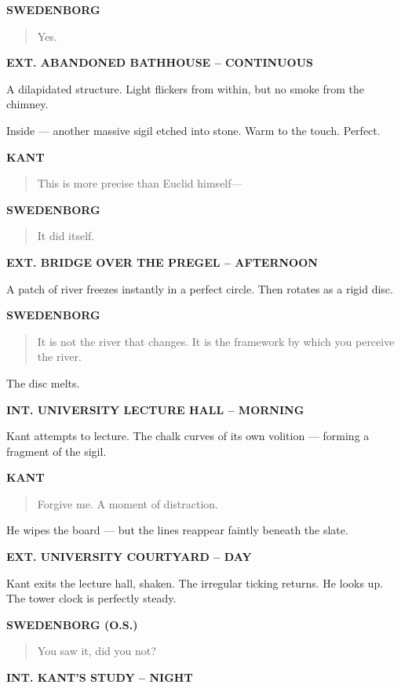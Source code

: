 \documentclass[12pt]{article}
\newcommand{\Scene}[1]{\vspace{1.2em}\textbf{#1}\vspace{0.8em}}
\newcommand{\Character}[1]{\vspace{0.8em}\textbf{#1}\vspace{0.4em}}
\newenvironment{Dialogue}{\begin{quote}\begin{RaggedRight}}{\end{RaggedRight}\end{quote}}
\newcommand{\Action}[1]{\vspace{0.4em}#1\vspace{0.4em}}
\begin{document}
\Character{SWEDENBORG}
\begin{Dialogue}
Yes.
\end{Dialogue}

\Scene{EXT. ABANDONED BATHHOUSE – CONTINUOUS}

\Action{A dilapidated structure.  
Light flickers from within, but no smoke from the chimney.}

\Action{Inside —  
another massive sigil etched into stone.  
Warm to the touch.  
Perfect.}

\Character{KANT}
\begin{Dialogue}
This is more precise than Euclid himself—
\end{Dialogue}

\Character{SWEDENBORG}
\begin{Dialogue}
It did itself.
\end{Dialogue}

\Scene{EXT. BRIDGE OVER THE PREGEL – AFTERNOON}

\Action{A patch of river freezes instantly in a perfect circle.  
Then rotates as a rigid disc.}

\Character{SWEDENBORG}
\begin{Dialogue}
It is not the river that changes.  
It is the framework by which you perceive the river.
\end{Dialogue}

\Action{The disc melts.}

\Scene{INT. UNIVERSITY LECTURE HALL – MORNING}

\Action{Kant attempts to lecture.  
The chalk curves of its own volition — forming a fragment of the sigil.}

\Character{KANT}
\begin{Dialogue}
Forgive me.  
A moment of distraction.
\end{Dialogue}

\Action{He wipes the board —  
but the lines reappear faintly beneath the slate.}

\Scene{EXT. UNIVERSITY COURTYARD – DAY}

\Action{Kant exits the lecture hall, shaken.  
The irregular ticking returns.  
He looks up.  
The tower clock is perfectly steady.}

\Character{SWEDENBORG (O.S.)}
\begin{Dialogue}
You saw it, did you not?
\end{Dialogue}

\Scene{INT. KANT’S STUDY – NIGHT}
\end{document}
